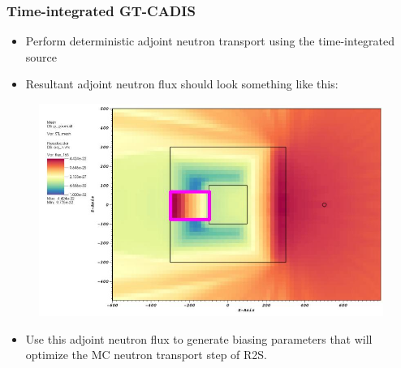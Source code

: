 \documentclass{beamer}
\begin{document}
\begin{frame}
	\frametitle{Time-integrated GT-CADIS}
	\begin{itemize}
		\item{Perform deterministic adjoint neutron transport using the
			time-integrated source}
		\item{Resultant adjoint neutron flux should look something like
			this:}
	\end{itemize}
        \begin{figure}
	\centering
	\includegraphics[scale=0.20]{tgt_adj_n.jpg}
	\end{figure}
	\begin{itemize}
		\item{Use this adjoint neutron flux to generate biasing
			parameters that will optimize the MC neutron transport
			step of R2S.}
	\end{itemize}
\end{frame}
\end{document}
